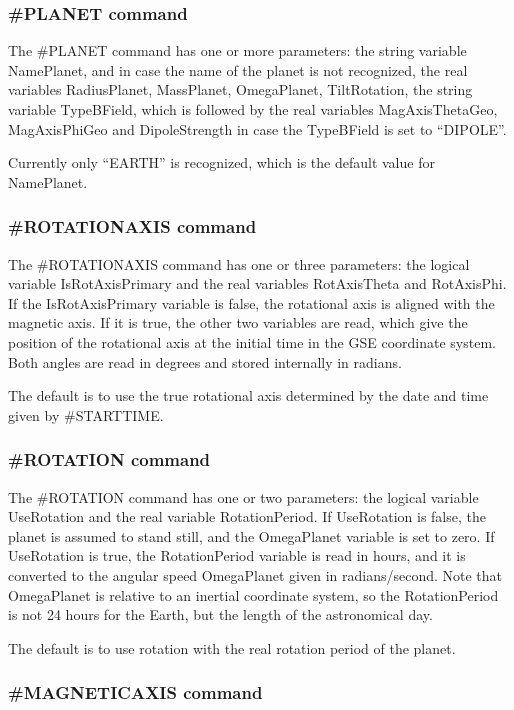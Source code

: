 \subsubsection{\#PLANET command}

The \#PLANET command has one or more parameters: the string
variable NamePlanet, and in case the name of the planet
is not recognized, the real variables RadiusPlanet,
MassPlanet, OmegaPlanet, TiltRotation, the string variable
TypeBField, which is followed by the real variables
MagAxisThetaGeo, MagAxisPhiGeo and DipoleStrength
in case the TypeBField is set to ``DIPOLE''.

Currently only ``EARTH'' is recognized, which is the default
value for NamePlanet.

\subsubsection{\#ROTATIONAXIS command}

The \#ROTATIONAXIS command has one or three parameters: the logical variable
IsRotAxisPrimary and the real variables RotAxisTheta and RotAxisPhi.
If the IsRotAxisPrimary variable is false, the rotational axis
is aligned with the magnetic axis. If it is true, the other two variables
are read, which give the position of the rotational axis at the
initial time in the GSE coordinate system. Both angles are read in degrees
and stored internally in radians.

The default is to use the true rotational axis determined by the 
date and time given by \#STARTTIME.

\subsubsection{\#ROTATION command}

The \#ROTATION command has one or two parameters: the logical variable
UseRotation and the real variable RotationPeriod. If UseRotation
is false, the planet is assumed to stand still, and the OmegaPlanet
variable is set to zero. If UseRotation is true, the RotationPeriod
variable is read in hours, and it is converted to the 
angular speed OmegaPlanet given in radians/second.
Note that OmegaPlanet is relative to an inertial coordinate system,
so the RotationPeriod is not 24 hours for the Earth, but the
length of the astronomical day.

The default is to use rotation with the real rotation period of the planet.

\subsubsection{\#MAGNETICAXIS command}

